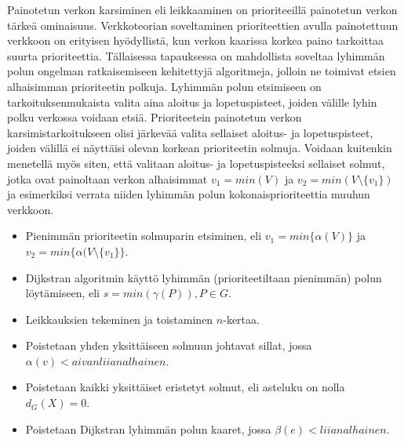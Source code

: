   Painotetun verkon karsiminen eli leikkaaminen on prioriteeillä painotetun verkon tärkeä ominaisuus.
  Verkkoteorian soveltaminen prioriteettien avulla painotettuun verkkoon on erityisen hyödyllistä, kun verkon kaarissa korkea paino tarkoittaa suurta prioriteettia.
  Tällaisessa tapauksessa on mahdollista soveltaa lyhimmän polun ongelman ratkaisemiseen kehitettyjä algoritmeja, jolloin ne toimivat etsien alhaisimman prioriteetin polkuja.
  Lyhimmän polun etsimiseen on tarkoituksenmukaista valita aina aloitus ja lopetuspisteet, joiden välille lyhin polku verkossa voidaan etsiä.
  Prioriteetein painotetun verkon karsimistarkoitukseen olisi järkevää valita sellaiset aloitus- ja lopetuspisteet, joiden välillä ei näyttäisi olevan korkean prioriteetin solmuja.
  Voidaan kuitenkin menetellä myös siten, että valitaan aloitus- ja lopetuspisteeksi sellaiset solmut, jotka ovat painoltaan verkon alhaisimmat \(v_1 = min(V)\) ja \(v_2 = min(V \setminus \{v_1\})\) ja esimerkiksi verrata niiden lyhimmän polun kokonaisprioriteettia muuhun verkkoon.

  \begin{itemize}
    \item Pienimmän prioriteetin solmuparin etsiminen, eli \(v_1 = min\{ \alpha(V) \}\) ja \(v_2 = min\{\alpha( V \setminus \{v_1\} \}\).
    \item Dijkstran algoritmin käyttö lyhimmän (prioriteetiltaan pienimmän) polun löytämiseen, eli \(s = min( \gamma(P) ), P \in G\).
    \item Leikkauksien tekeminen ja toistaminen \(n\)-kertaa.
    \item Poistetaan yhden yksittäiseen solmuun johtavat sillat, jossa \(\alpha(v) < aivan liian alhainen \).
    \item Poistetaan kaikki yksittäiset eristetyt solmut, eli asteluku on nolla \(d_G(X) = 0\).
    \item Poistetaan Dijkstran lyhimmän polun kaaret, jossa \(\beta(e) < liian alhainen \).
  \end{itemize}

